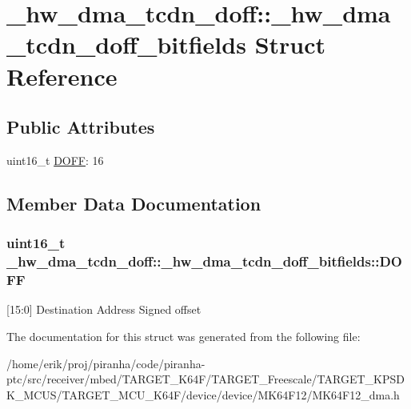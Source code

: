 \hypertarget{struct__hw__dma__tcdn__doff_1_1__hw__dma__tcdn__doff__bitfields}{}\section{\+\_\+hw\+\_\+dma\+\_\+tcdn\+\_\+doff\+:\+:\+\_\+hw\+\_\+dma\+\_\+tcdn\+\_\+doff\+\_\+bitfields Struct Reference}
\label{struct__hw__dma__tcdn__doff_1_1__hw__dma__tcdn__doff__bitfields}
\subsection*{Public Attributes}
\begin{DoxyCompactItemize}
\item 
uint16\+\_\+t \hyperlink{struct__hw__dma__tcdn__doff_1_1__hw__dma__tcdn__doff__bitfields_a53b020e319ca6a9e80793d2536b4d721}{D\+O\+FF}\+: 16
\end{DoxyCompactItemize}


\subsection{Member Data Documentation}
\subsubsection[{\texorpdfstring{D\+O\+FF}{DOFF}}]{\setlength{\rightskip}{0pt plus 5cm}uint16\+\_\+t \+\_\+hw\+\_\+dma\+\_\+tcdn\+\_\+doff\+::\+\_\+hw\+\_\+dma\+\_\+tcdn\+\_\+doff\+\_\+bitfields\+::\+D\+O\+FF}\hypertarget{struct__hw__dma__tcdn__doff_1_1__hw__dma__tcdn__doff__bitfields_a53b020e319ca6a9e80793d2536b4d721}{}\label{struct__hw__dma__tcdn__doff_1_1__hw__dma__tcdn__doff__bitfields_a53b020e319ca6a9e80793d2536b4d721}
\mbox{[}15\+:0\mbox{]} Destination Address Signed offset 

The documentation for this struct was generated from the following file\+:\begin{DoxyCompactItemize}
\item 
/home/erik/proj/piranha/code/piranha-\/ptc/src/receiver/mbed/\+T\+A\+R\+G\+E\+T\+\_\+\+K64\+F/\+T\+A\+R\+G\+E\+T\+\_\+\+Freescale/\+T\+A\+R\+G\+E\+T\+\_\+\+K\+P\+S\+D\+K\+\_\+\+M\+C\+U\+S/\+T\+A\+R\+G\+E\+T\+\_\+\+M\+C\+U\+\_\+\+K64\+F/device/device/\+M\+K64\+F12/M\+K64\+F12\+\_\+dma.\+h\end{DoxyCompactItemize}
